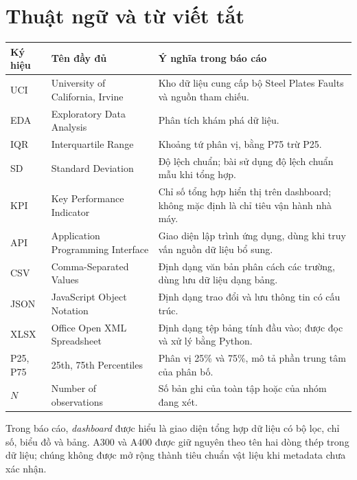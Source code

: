 \chapter*{Thuật ngữ và từ viết tắt}

\begin{center}
\small
\begin{tabularx}{\linewidth}{@{}p{1.5cm}Y Y@{}}
\toprule
\textbf{Ký hiệu} & \textbf{Tên đầy đủ} & \textbf{Ý nghĩa trong báo cáo} \\
\midrule
UCI & University of California, Irvine & Kho dữ liệu cung cấp bộ Steel Plates Faults và nguồn tham chiếu. \\
EDA & Exploratory Data Analysis & Phân tích khám phá dữ liệu. \\
IQR & Interquartile Range & Khoảng tứ phân vị, bằng P75 trừ P25. \\
SD & Standard Deviation & Độ lệch chuẩn; bài sử dụng độ lệch chuẩn mẫu khi tổng hợp. \\
KPI & Key Performance Indicator & Chỉ số tổng hợp hiển thị trên dashboard; không mặc định là chỉ tiêu vận hành nhà máy. \\
API & Application Programming Interface & Giao diện lập trình ứng dụng, dùng khi truy vấn nguồn dữ liệu bổ sung. \\
CSV & Comma-Separated Values & Định dạng văn bản phân cách các trường, dùng lưu dữ liệu dạng bảng. \\
JSON & JavaScript Object Notation & Định dạng trao đổi và lưu thông tin có cấu trúc. \\
XLSX & Office Open XML Spreadsheet & Định dạng tệp bảng tính đầu vào; được đọc và xử lý bằng Python. \\
P25, P75 & 25th, 75th Percentiles & Phân vị 25\% và 75\%, mô tả phần trung tâm của phân bố. \\
$N$ & Number of observations & Số bản ghi của toàn tập hoặc của nhóm đang xét. \\
\bottomrule
\end{tabularx}
\end{center}

Trong báo cáo, \textit{dashboard} được hiểu là giao diện tổng hợp dữ liệu có bộ lọc, chỉ số, biểu đồ và bảng. A300 và A400 được giữ nguyên theo tên hai dòng thép trong dữ liệu; chúng không được mở rộng thành tiêu chuẩn vật liệu khi metadata chưa xác nhận.
